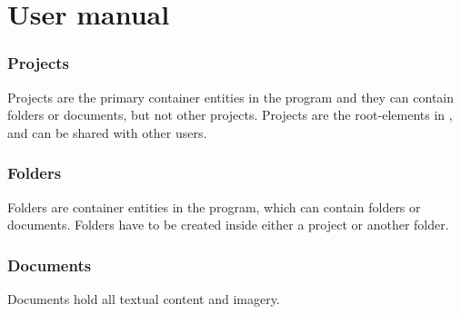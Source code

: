 \section{User manual}
\subsubsection{Projects}
Projects are the primary container entities in the program and they can contain folders or documents, but not other projects.
Projects are the root-elements in \SOP{}, and can be shared with other users.

\subsubsection{Folders}
Folders are container entities in the program, which can contain folders or documents. Folders have to be created inside either a project or another folder.

\subsubsection{Documents}
Documents hold all textual content and imagery.




